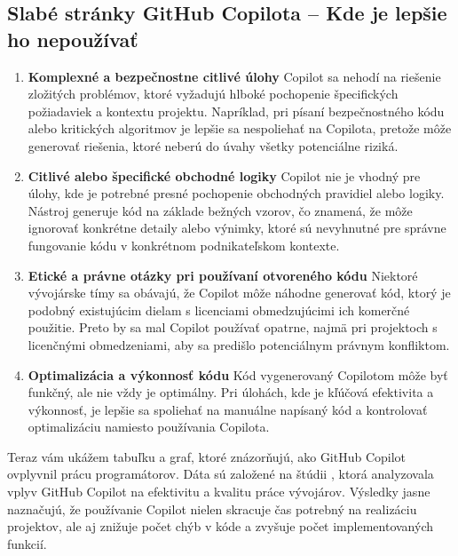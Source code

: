 \documentclass[10pt,oneside,slovak,a4paper, onecolumn]{article}
\begin{document}
\subsection{Slabé stránky GitHub Copilota – Kde je lepšie ho nepoužívať}
\begin{enumerate}
    \item \textbf{Komplexné a bezpečnostne citlivé úlohy}
    Copilot sa nehodí na riešenie zložitých problémov, ktoré vyžadujú hlboké pochopenie špecifických požiadaviek a kontextu projektu. Napríklad, pri písaní bezpečnostného kódu alebo kritických algoritmov je lepšie sa nespoliehať na Copilota, pretože môže generovať riešenia, ktoré neberú do úvahy všetky potenciálne riziká.
    \item \textbf{Citlivé alebo špecifické obchodné logiky}
    Copilot nie je vhodný pre úlohy, kde je potrebné presné pochopenie obchodných pravidiel alebo logiky. Nástroj generuje kód na základe bežných vzorov, čo znamená, že môže ignorovať konkrétne detaily alebo výnimky, ktoré sú nevyhnutné pre správne fungovanie kódu v konkrétnom podnikateľskom kontexte.
    \item \textbf{Etické a právne otázky pri používaní otvoreného kódu}
    Niektoré vývojárske tímy sa obávajú, že Copilot môže náhodne generovať kód, ktorý je podobný existujúcim dielam s licenciami obmedzujúcimi ich komerčné použitie. Preto by sa mal Copilot používať opatrne, najmä pri projektoch s licenčnými obmedzeniami, aby sa predišlo potenciálnym právnym konfliktom.
    \item \textbf{Optimalizácia a výkonnosť kódu}
    Kód vygenerovaný Copilotom môže byť funkčný, ale nie vždy je optimálny. Pri úlohách, kde je kľúčová efektivita a výkonnosť, je lepšie sa spoliehať na manuálne napísaný kód a kontrolovať optimalizáciu namiesto používania Copilota.
\end{enumerate}
Teraz vám ukážem tabuľku a graf, ktoré znázorňujú, ako GitHub Copilot ovplyvnil prácu programátorov. Dáta sú založené na štúdii \cite{ikaliam}, ktorá analyzovala vplyv GitHub Copilot na efektivitu a kvalitu práce vývojárov. Výsledky jasne naznačujú, že používanie Copilot nielen skracuje čas potrebný na realizáciu projektov, ale aj znižuje počet chýb v kóde a zvyšuje počet implementovaných funkcií.
\end{document}
